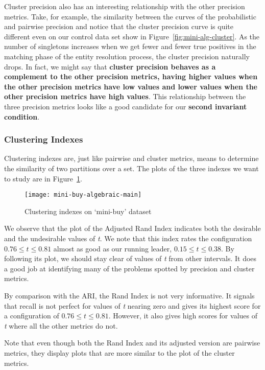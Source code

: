Cluster precision also has an interesting relationship with the other precision
metrics.
Take, for example, the similarity between the curves of the probabilistic and
pairwise precision and notice that the cluster precision curve is quite
different even on our control data set show in Figure~\ref{fig:mini-alg-cluster}.
As the number of singletons increases when we get fewer and fewer true positives
in the matching phase of the entity resolution process, the cluster precision
naturally drops.
In fact, we might say that \textbf{cluster precision behaves as a complement to the
other precision metrics, having higher values when the other precision metrics
have low values and lower values when the other precision metrics have high
values}.
This relationship between the three precision metrics looks like a good
candidate for our \textbf{second invariant condition}.

\subsubsection{Clustering Indexes}

Clustering indexes are, just like pairwise and cluster metrics, means to
determine the similarity of two partitions over a set.
The plots of the three indexes we want to study are in Figure~\ref{fig:mini-alg}.

\begin{figure}[htbp]
    \centering
    \captionsetup{justification=centering}
    \texttt{[image: mini-buy-algebraic-main]}
    \caption{Clustering indexes on `mini-buy' dataset}
    \label{fig:mini-alg}
\end{figure}

We observe that the plot of the Adjusted Rand Index indicates both the desirable
and the undesirable values of \textit{t}.
We note that this index rates the configuration $0.76 \le t \le 0.81$ almost as
good as our running leader, $0.15 \le t \le 0.38$.
By following its plot, we should stay clear of values of \textit{t} from other
intervals.
It does a good job at identifying many of the problems spotted by precision and
cluster metrics.

By comparison with the ARI, the Rand Index is not very informative.
It signals that recall is not perfect for values of \textit{t} nearing zero and
gives its highest score for a configuration of $0.76 \le t \le 0.81$.
However, it also gives high scores for values of \textit{t} where all the other
metrics do not.

Note that even though both the Rand Index and its adjusted version are pairwise
metrics, they display plots that are more similar to the plot of the cluster
metrics.

